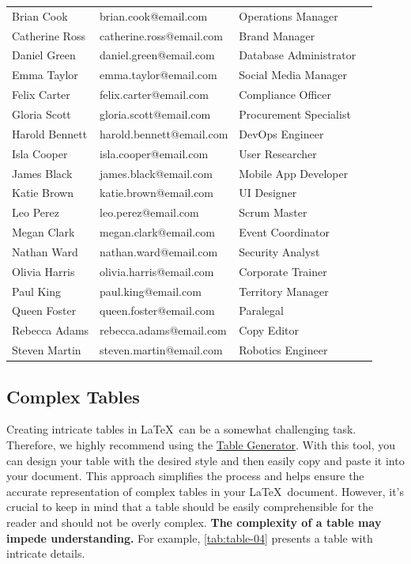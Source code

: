 {\begin{longtable}[c]{llll}
Brian Cook & brian.cook@email.com & Operations Manager \\
Catherine Ross & catherine.ross@email.com & Brand Manager \\
Daniel Green & daniel.green@email.com & Database Administrator \\
Emma Taylor & emma.taylor@email.com & Social Media Manager \\
Felix Carter & felix.carter@email.com & Compliance Officer \\
Gloria Scott & gloria.scott@email.com & Procurement Specialist \\
Harold Bennett & harold.bennett@email.com & DevOps Engineer \\
Isla Cooper & isla.cooper@email.com & User Researcher \\
James Black & james.black@email.com & Mobile App Developer \\
Katie Brown & katie.brown@email.com & UI Designer \\
Leo Perez & leo.perez@email.com & Scrum Master \\
Megan Clark & megan.clark@email.com & Event Coordinator \\
Nathan Ward & nathan.ward@email.com & Security Analyst \\
Olivia Harris & olivia.harris@email.com & Corporate Trainer \\
Paul King & paul.king@email.com & Territory Manager \\
Queen Foster & queen.foster@email.com & Paralegal \\
Rebecca Adams & rebecca.adams@email.com & Copy Editor \\
Steven Martin & steven.martin@email.com & Robotics Engineer \\
\bottomrule
\end{longtable}

\subsection{Complex Tables}
Creating intricate tables in \LaTeX\ can be a somewhat challenging task. Therefore, we highly recommend using the \href{https://www.tablesgenerator.com/}{Table Generator}. With this tool, you can design your table with the desired style and then easily copy and paste it into your document. This approach simplifies the process and helps ensure the accurate representation of complex tables in your \LaTeX\ document. However, it's crucial to keep in mind that a table should be easily comprehensible for the reader and should not be overly complex. \textbf{The complexity of a table may impede understanding.} For example, \autoref{tab:table-04} presents a table with intricate details.

}

